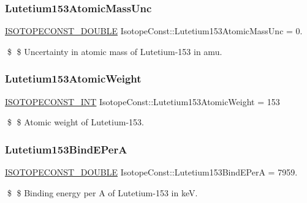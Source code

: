 \subsubsection{\texorpdfstring{Lutetium153\+Atomic\+Mass\+Unc}{Lutetium153AtomicMassUnc}}
{\footnotesize\ttfamily \mbox{\hyperlink{group___isotope_const-_macros_ga8f45a7272ce02c0b4c65c44636ed719a}{I\+S\+O\+T\+O\+P\+E\+C\+O\+N\+S\+T\+\_\+\+D\+O\+U\+B\+LE}} Isotope\+Const\+::\+Lutetium153\+Atomic\+Mass\+Unc = 0.}

\$ \$ Uncertainty in atomic mass of Lutetium-\/153 in amu. \mbox{\label{group___isotope_const-_lutetium-_lu153_ga0e082e6e691ad912903effeaef6ea9c9}} 
\subsubsection{\texorpdfstring{Lutetium153\+Atomic\+Weight}{Lutetium153AtomicWeight}}
{\footnotesize\ttfamily \mbox{\hyperlink{group___isotope_const-_macros_ga5f18360b3e99483a35c32d789e62621c}{I\+S\+O\+T\+O\+P\+E\+C\+O\+N\+S\+T\+\_\+\+I\+NT}} Isotope\+Const\+::\+Lutetium153\+Atomic\+Weight = 153}

\$ \$ Atomic weight of Lutetium-\/153. \mbox{\label{group___isotope_const-_lutetium-_lu153_gae436d677a10e27b398f3faf9755972d9}} 
\subsubsection{\texorpdfstring{Lutetium153\+Bind\+E\+PerA}{Lutetium153BindEPerA}}
{\footnotesize\ttfamily \mbox{\hyperlink{group___isotope_const-_macros_ga8f45a7272ce02c0b4c65c44636ed719a}{I\+S\+O\+T\+O\+P\+E\+C\+O\+N\+S\+T\+\_\+\+D\+O\+U\+B\+LE}} Isotope\+Const\+::\+Lutetium153\+Bind\+E\+PerA = 7959.}

\$ \$ Binding energy per A of Lutetium-\/153 in keV. \mbox{\label{group___isotope_const-_lutetium-_lu153_ga8af14f51a150aae6ac2519ef89f83784}} 
